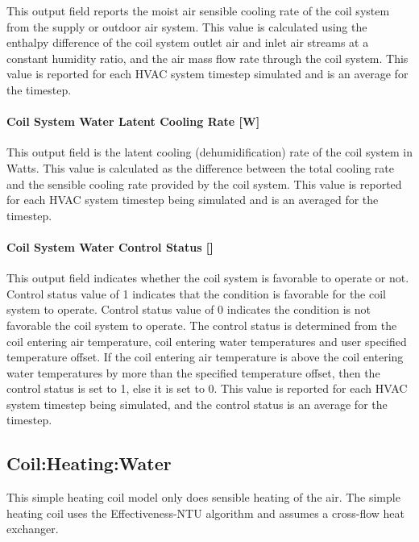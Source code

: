 This output field reports the moist air sensible cooling rate of the coil system from the supply or outdoor air system. This value is calculated using the enthalpy difference of the coil system outlet air and inlet air streams at a constant humidity ratio, and the air mass flow rate through the coil system. This value is reported for each HVAC system timestep simulated and is an average for the timestep.

\paragraph{Coil System Water Latent Cooling Rate {[}W{]}}\label{coil-system-water-latent-cooling-rate}

This output field is the latent cooling (dehumidification) rate of the coil system in Watts. This value is calculated as the difference between the total cooling rate and the sensible cooling rate provided by the coil system. This value is reported for each HVAC system timestep being simulated and is an averaged for the timestep.

\paragraph{Coil System Water Control Status {[]}}\label{coil-system-water-control-status}

This output field indicates whether the coil system is favorable to operate or not. Control status value of 1 indicates that the condition is favorable for the coil system to operate. Control status value of 0 indicates the condition is not favorable the coil system to operate. The control status is determined from the coil entering air temperature, coil entering water temperatures and user specified temperature offset. If the coil entering air temperature is above the coil entering water temperatures by more than the specified temperature offset, then the control status is set to 1, else it is set to 0. This value is reported for each HVAC system timestep being simulated, and the control status is an average for the timestep.


\subsection{Coil:Heating:Water}\label{coilheatingwater}

This simple heating coil model only does sensible heating of the air. The simple heating coil uses the Effectiveness-NTU algorithm and assumes a cross-flow heat exchanger.

